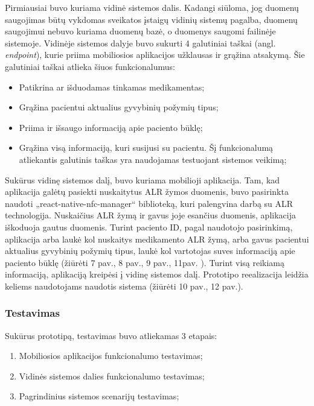 Pirmiausiai buvo kuriama vidinė sistemos dalis. Kadangi siūloma, jog duomenų saugojimas būtų vykdomas sveikatos įstaigų vidinių sistemų pagalba, duomenų saugojimui nebuvo kuriama duomenų bazė, o duomenys saugomi failinėje sistemoje. Vidinėje sistemos dalyje buvo sukurti 4 galutiniai taškai (angl. \textit{endpoint}), kurie priima mobiliosios aplikacijos užklausas ir grąžina atsakymą. Šie galutiniai taškai atlieka šiuos funkcionalumus: 
\begin{itemize}
    \item Patikrina ar išduodamas tinkamas medikamentas;
    \item Grąžina pacientui aktualius gyvybinių požymių tipus;
    \item Priima ir išsaugo informaciją apie paciento būklę;
    \item Grąžina visą informaciją, kuri susijusi su pacientu. Šį funkcionalumą atliekantis galutinis taškas yra naudojamas testuojant sistemos veikimą;
\end{itemize}
Sukūrus vidinę sistemos dalį, buvo kuriama mobilioji aplikacija. Tam, kad aplikacija galėtų pasiekti nuskaitytus ALR žymos duomenis, buvo pasirinkta naudoti „react-native-nfc-manager“ biblioteką,  kuri palengvina darbą su ALR technologija. Nuskaičius ALR žymą ir gavus joje esančius duomenis, aplikacija iškoduoja gautus duomenis. Turint paciento ID, pagal naudotojo pasirinkimą, aplikacija arba laukė kol nuskaitys medikamento ALR žymą, arba gavus pacientui aktualius gyvybinių požymių tipus, laukė kol vartotojas suves informaciją apie paciento būklę (žiūrėti 7 pav., 8 pav., 9 pav., 11pav. ). Turint visą reikiamą informaciją, aplikaciją kreipėsi į vidinę sistemos dalį. Prototipo reealizacija leidžia keliems naudotojams naudotis sistema (žiūrėti 10 pav., 12 pav.).



\subsubsection{Testavimas}

Sukūrus prototipą, testavimas buvo atliekamas 3 etapais:
\begin{enumerate}
    \item Mobiliosios aplikacijos funkcionalumo testavimas;
    \item Vidinės sistemos dalies funkcionalumo testavimas;
    \item Pagrindinius sistemos scenarijų testavimas;
\end{enumerate}

